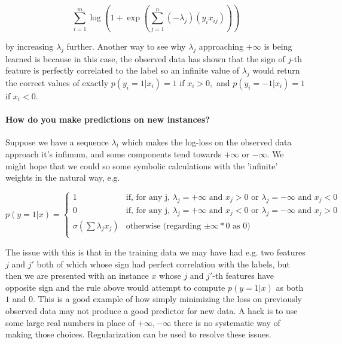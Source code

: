 \documentclass[a4paper,12pt]{article}
\begin{document}
$$\sum_{i=1}^m \log\left(1+\exp\left(\sum_{j=1}^n (-\lambda_j) (y_i x_{ij})\right)\right)$$

by increasing $\lambda_j$ further. Another way to see why $\lambda_j$ approaching $+\infty$ is being learned is because in this case, the observed data has shown that the sign of $j$-th feature is perfectly correlated to the label so an infinite value of $\lambda_j$ would return the correct values of exactly $p(y_i=1|x_i)=1$ if $x_i >0,$ and $p(y_i=-1|x_i)=1$ if $x_i <0.$

\paragraph{How do you make predictions on new instances?}
Suppose we have a sequence $\lambda_t$ which makes the log-loss on the observed data approach it's infimum, and some components tend towards $+\infty$ or $-\infty.$ We might hope that we could so some symbolic calculations with the 'infinite' weights in the natural way, e.g. 

\[
  p(y=1|x) =
  \begin{cases}
                                   1 & \text{if, for any j, }\lambda_j=+\infty \text{ and } x_j >0 \text{ or } \lambda_j=-\infty \text{ and } x_j <0  \\
                                    0 & \text{if, for any j, }\lambda_j=+\infty \text{ and } x_j <0 \text{ or } \lambda_j=-\infty \text{ and } x_j >0  \\
                                   \sigma(\sum \lambda_j x_j) & \text{otherwise (regarding $\pm \infty * 0 $ as 0)} \\
  \end{cases}
\]

The issue with this is that in the training data we may have had e.g. two features $j$ and $j'$ both of which whose sign had perfect correlation with the labels, but then we are presented with an instance $x$ whose $j$ and $j'$-th features have opposite sign and the rule above would attempt to compute $p(y=1|x)$ as both $1$ and $0.$ This is a good example of how simply minimizing the loss on previously observed data may not produce a good predictor for new data. A hack is to use some large real numbers in place of $+\infty, -\infty$ there is no systematic way of making those choices. Regularization can be used to resolve these issues. 
\end{document}

